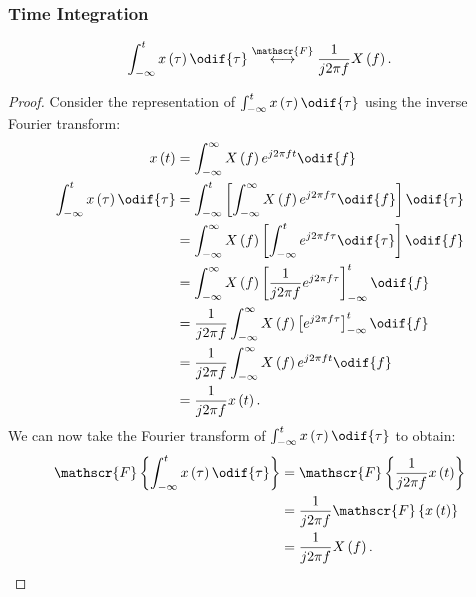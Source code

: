 \documentclass{article}
\begin{document}
\subsubsection{Time Integration}
\begin{equation*}
    \int_{-\infty}^t x\left( \tau \right) \odif{\tau} \overset{\mathscr{F}}{\longleftrightarrow} \frac{1}{j 2\pi f} X\left( f \right).
\end{equation*}
\begin{proof}
    Consider the representation of \(\int_{-\infty}^t x\left( \tau \right) \odif{\tau}\) using the inverse Fourier transform:
    \begin{align*}
        x\left( t \right)                                 & = \int_{-\infty}^\infty X\left( f \right) e^{j 2\pi f t} \odif{f}                                                  \\
        \int_{-\infty}^t x\left( \tau \right) \odif{\tau} & = \int_{-\infty}^t \left[ \int_{-\infty}^\infty X\left( f \right) e^{j 2\pi f \tau} \odif{f} \right] \odif{\tau}   \\
                                                          & = \int_{-\infty}^\infty X\left( f \right) \left[ \int_{-\infty}^t e^{j 2\pi f \tau} \odif{\tau} \right] \odif{f}   \\
                                                          & = \int_{-\infty}^\infty X\left( f \right) \left[ \frac{1}{j 2\pi f} e^{j 2\pi f \tau} \right]_{-\infty}^t \odif{f} \\
                                                          & = \frac{1}{j 2\pi f} \int_{-\infty}^\infty X\left( f \right) \left[ e^{j 2\pi f \tau} \right]_{-\infty}^t \odif{f} \\
                                                          & = \frac{1}{j 2\pi f} \int_{-\infty}^\infty X\left( f \right) e^{j 2\pi f t} \odif{f}                               \\
                                                          & = \frac{1}{j 2\pi f} x\left( t \right).
    \end{align*}
    We can now take the Fourier transform of \(\int_{-\infty}^t x\left( \tau \right) \odif{\tau}\) to obtain:
    \begin{align*}
        \mathscr{F}\left\{ \int_{-\infty}^t x\left( \tau \right) \odif{\tau} \right\} & = \mathscr{F}\left\{ \frac{1}{j 2\pi f} x\left( t \right) \right\} \\
                                                                                      & = \frac{1}{j 2\pi f} \mathscr{F}\left\{ x\left( t \right) \right\} \\
                                                                                      & = \frac{1}{j 2\pi f} X\left( f \right).
    \end{align*}
\end{proof}
\end{document}
